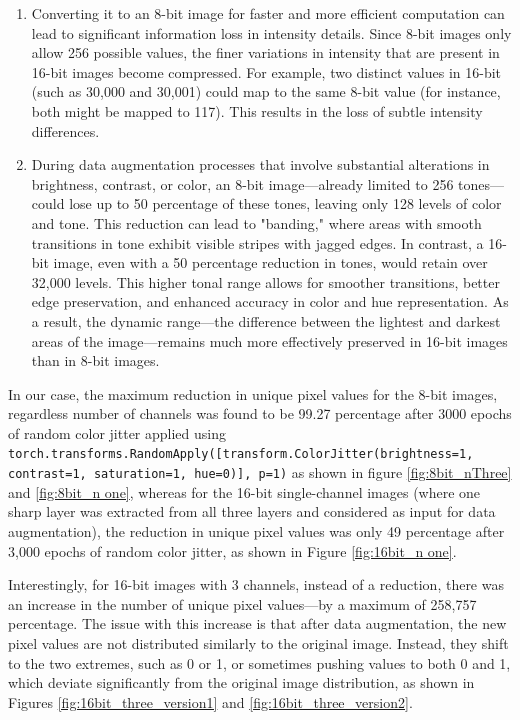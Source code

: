 \begin{enumerate}
  \item Converting it to an 8-bit image for faster and more efficient computation can lead to significant information loss in intensity details. Since 8-bit images only allow 256 possible values, the finer variations in intensity that are present in 16-bit images become compressed. For example, two distinct values in 16-bit (such as 30,000 and 30,001) could map to the same 8-bit value (for instance, both might be mapped to 117). This results in the loss of subtle intensity differences. 

  \item During data augmentation processes that involve substantial alterations in brightness, contrast, or color, an 8-bit image—already limited to 256 tones—could lose up to 50 percentage of these tones, leaving only 128 levels of color and tone. This reduction can lead to "banding," where areas with smooth transitions in tone exhibit visible stripes with jagged edges. In contrast, a 16-bit image, even with a 50 percentage reduction in tones, would retain over 32,000 levels. This higher tonal range allows for smoother transitions, better edge preservation, and enhanced accuracy in color and hue representation. As a result, the dynamic range—the difference between the lightest and darkest areas of the image—remains much more effectively preserved in 16-bit images than in 8-bit images.
\end{enumerate}
In our case, the maximum reduction in unique pixel values for the 8-bit images, regardless number of channels was found to be 99.27 percentage after 3000 epochs of random
color jitter applied  using \texttt{torch.transforms.RandomApply([transform.ColorJitter(brightness=1, contrast=1, saturation=1, hue=0)], p=1)} as shown in figure \ref{fig:8bit_nThree} and \ref{fig:8bit_n one}, whereas for the 16-bit single-channel images (where one sharp layer was extracted from all three layers and considered as input for data augmentation), the reduction in unique pixel values was only 49 percentage after 3,000 epochs of random color jitter, as shown in Figure \ref{fig:16bit_n one}.

Interestingly, for 16-bit images with 3 channels, instead of a reduction, there was an increase in the number of unique pixel values—by a maximum of 258,757 percentage. The issue with this increase is that after data augmentation, the new pixel values are not distributed similarly to the original image. Instead, they shift to the two extremes, such as 0 or 1, or sometimes pushing values to both 0 and 1, which deviate significantly from the original image distribution, as shown in Figures \ref{fig:16bit_three_version1} and \ref{fig:16bit_three_version2}.

